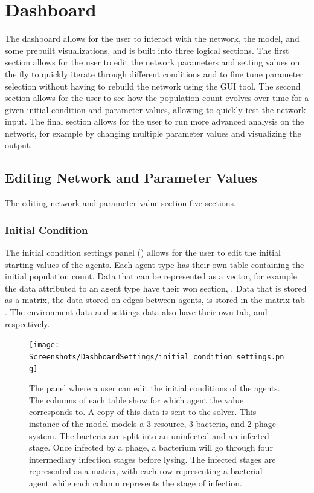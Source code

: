 \section{Dashboard}
The dashboard allows for the user to interact with the network, the model, and some prebuilt visualizations, and is built into three logical sections. 
The first section allows for the user to edit the network parameters and setting values on the fly to quickly iterate through different conditions and to fine tune parameter selection without having to rebuild the network using the GUI tool. 
The second section allows for the user to see how the population count evolves over time for a given initial condition and parameter values, allowing to quickly test the network input. 
The final section allows for the user to run more advanced analysis on the network, for example by changing multiple parameter values and visualizing the output. 


\subsection{Editing Network and Parameter Values}
\label{sec:editing_network_and_parameter_values}
The editing network and parameter value section five sections. 
\subsubsection{Initial Condition}
The initial condition settings panel () allows for the user to edit the initial starting values of the agents. 
Each agent type has their own table containing the initial population count. 
Data that can be represented as a vector, for example the data attributed to an agent type have their won section, . 
Data that is stored as a matrix, the data stored on edges between agents, is stored in the matrix tab . 
The environment data and settings data also have their own tab,  and  respectively. 

\begin{figure}
    \centering
    \texttt{[image: Screenshots/DashboardSettings/initial\_condition\_settings.png]}
    \caption{
        The panel where a user can edit the initial conditions of the agents. 
        The columns of each table show for which agent the value corresponds to. 
        A copy of this data is sent to the solver. 
        This instance of the model models a 3 resource, 3 bacteria, and 2 phage system. 
        The bacteria are split into an uninfected and an infected stage. 
        Once infected by a phage, a bacterium will go through four intermediary infection stages before lysing. 
        The infected stages are represented as a matrix, with each row representing a bacterial agent while each column represents the stage of infection. 
    }
    \label{fig:ss:ds:initial_condition}
\end{figure}

